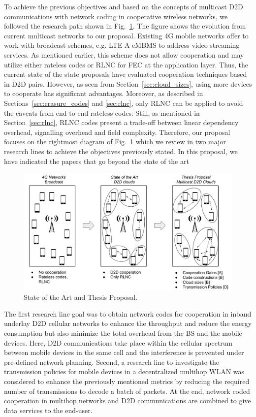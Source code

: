 To achieve the previous objectives and based on the concepts of multicast \ac{D2D} communications with network coding in cooperative wireless networks, we followed the research path shown in Fig.~\ref{fig:proposal}. The figure shows the evolution from current multicast networks to our proposal. Existing 4G mobile networks offer to work with broadcast schemes, e.g. \ac{LTE-A} \ac{eMBMS} to address video streaming services. As mentioned earlier, this scheme does not allow cooperation and may utilize either rateless codes or \ac{RLNC} for \ac{FEC} at the application layer. Thus, the current state of the state proposals have evaluated cooperation techniques based in \ac{D2D} pairs. However, as seen from Section~\ref{sec:cloud_sizes}, using more devices to cooperate has significant advantages. Moreover, as described in Sections~\ref{sec:erasure_codes} and \ref{sec:rlnc}, only \ac{RLNC} can be applied to avoid the caveats from end-to-end rateless codes. Still, as mentioned in Section~\ref{sec:rlnc}, \ac{RLNC} codes present a trade-off between linear dependency overhead, signalling overhead and field complexity. Therefore, our proposal focuses on the rightmost diagram of Fig.~\ref{fig:proposal} which we review in two major research lines to achieve the objectives previously stated. In this proposal, we have indicated the papers that go beyond the state of the art

\begin{figure}[h]
  \centering
  \includegraphics[width=\textwidth]{introduction/figures/thesis-diagrams.pdf}
  \caption{State of the Art and Thesis Proposal.}
\label{fig:proposal}
\end{figure}

The first research line goal was to obtain network codes for cooperation in inband underlay \ac{D2D} cellular networks to enhance the throughput and reduce the energy consumption but also minimize the total overhead from the \ac{BS} and the mobile devices. Here, \ac{D2D} communications take place within the cellular spectrum between mobile devices in the same cell and the interference is prevented under pre-defined network planning. Second, a research line to investigate the transmission policies for mobile devices in a decentralized multihop \ac{WLAN} was considered to enhance the previously mentioned metrics by reducing the required number of transmissions to decode a batch of packets. At the end, network coded cooperation in multihop networks and \ac{D2D} communications are combined to give data services to the end-user.

